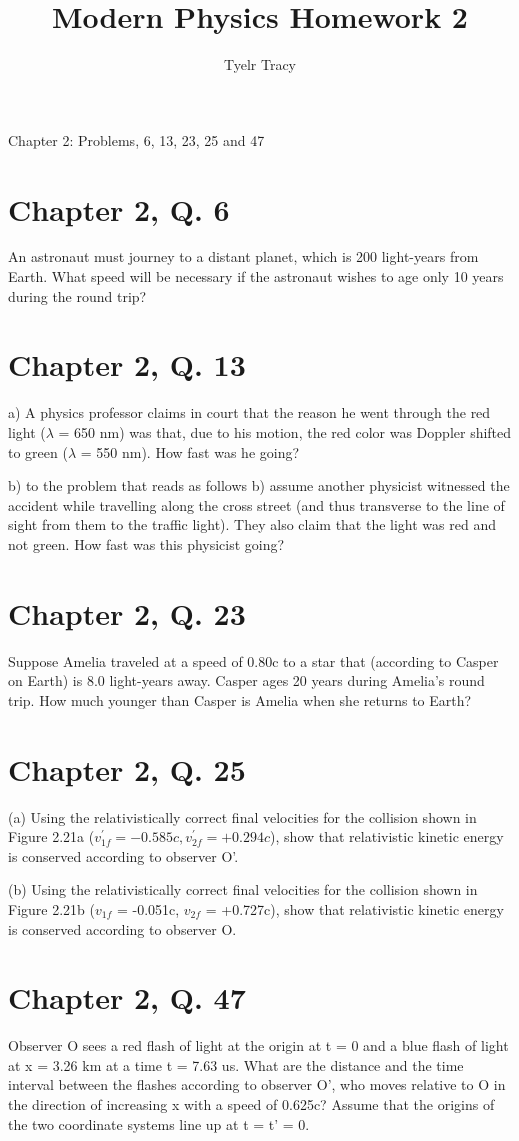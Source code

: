 \documentclass{article}
\title{Modern Physics Homework 2}
\author{Tyelr Tracy}
\begin{document}
\maketitle

Chapter 2: Problems, 6, 13, 23, 25 and 47

\section*{Chapter 2, Q. 6}
An astronaut must journey to a distant planet, which is 200 light-years from Earth. What speed will be necessary if the astronaut wishes to age only 10 years during the round trip?

\section*{Chapter 2, Q. 13}
a) A physics professor claims in court that the reason he went through the red light ($\lambda$ = 650 nm) was that, due to his motion, the red color was Doppler shifted to green ($\lambda$ = 550 nm). How fast was he going?

b) to the problem that reads as follows b) assume another physicist witnessed the accident while travelling along the cross street (and thus transverse to the line of sight from them to the traffic light). They also claim that the light was red and not green. How fast was this physicist going?


\section*{Chapter 2, Q. 23}
Suppose Amelia traveled at a speed of 0.80c to a star that (according to Casper on Earth) is 8.0 light-years away.  Casper ages 20 years during Amelia's round trip. How much younger than Casper is Amelia when she returns to Earth?

\section*{Chapter 2, Q. 25}
(a) Using the relativistically correct final velocities for the collision shown in Figure 2.21a ($v^{'}_{1f} = -0.585c, v^{'}_{2f}=+0.294c$), show that relativistic kinetic energy is conserved according to observer O'.

(b) Using the relativistically correct final velocities for the collision shown in Figure 2.21b ($v_{1f}$ = -0.051c, $v_{2f}$ = +0.727c), show that relativistic kinetic energy is conserved according to observer O.

\section*{Chapter 2, Q. 47}
Observer O sees a red flash of light at the origin at t = 0 and a blue flash of light at x = 3.26 km at a time t = 7.63 us. What are the distance and the time interval between the flashes according to observer O', who moves relative to O in the direction of increasing x with a speed of 0.625c?  Assume that the origins of the two coordinate systems line up at t = t' = 0.
\end{document}
